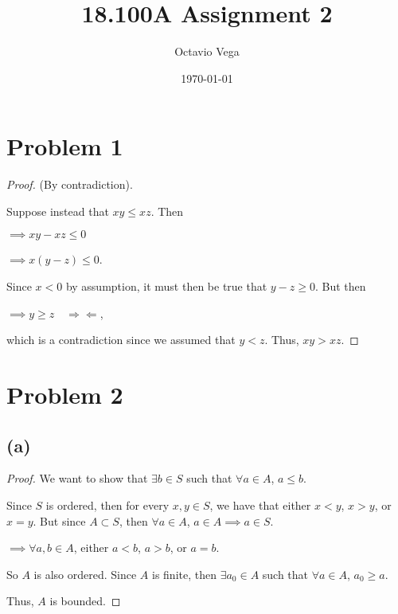 \documentclass{article}
\title{18.100A Assignment 2}
\author{Octavio Vega}
\date\today
\begin{document}
\maketitle
	
\section*{Problem 1}
\begin{proof}
	(By contradiction).
	
	Suppose instead that $xy \leq xz$. Then
	
	$\implies xy - xz \leq 0$
	
	$\implies x(y-z) \leq 0$.
	
	Since $x<0$ by assumption, it must then be true that $y-z\geq 0$. But then
	
	$\implies y \geq z \quad \Rightarrow\Leftarrow$,
	
	which is a contradiction since we assumed that $y<z$. Thus, $xy>xz$.
\end{proof}

\section*{Problem 2}
\subsection*{(a)}
\begin{proof}
	We want to show that $\exists b\in S$ such that $\forall a\in A$, $a\leq b$.

	Since $S$ is ordered, then for every $x,y\in S$, we have that either $x<y$, $x>y$, or $x=y$. But since $A\subset S$, then $\forall a\in A$, $a\in A \implies a\in S$. 
	
	$\implies \forall a,b\in A$, either $a<b$, $a>b$, or $a=b$. 
	
	So $A$ is also ordered. Since $A$ is finite, then $\exists a_0 \in A$ such that $\forall a \in A$, $a_0 \geq a$. 
	
	Thus, $A$ is bounded.
\end{proof}
\end{document}
